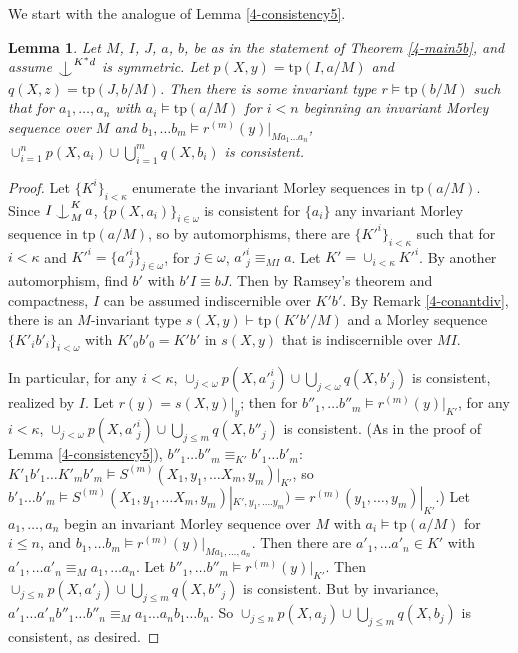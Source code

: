 \documentclass[12pt]{amsart}
\newtheorem{lemma}[theorem]{Lemma}
\theoremstyle{definition}
\def\Ind#1#2{#1\setbox0=\hbox{$#1x$}\kern\wd0\hbox to 0pt{\hss$#1\mid$\hss}
\lower.9\ht0\hbox to 0pt{\hss$#1\smile$\hss}\kern\wd0}
\def\ind{\mathop{\mathpalette\Ind{}}}
\begin{document}
We start with the analogue of Lemma \ref{4-consistency5}.

\begin{lemma}\label{4-consistency5b}
 Let $M$, $I$, $J$, $a$, $b$, be as in the statement of Theorem \ref{4-main5b}, and assume $\ind^{K^{*}d}$ is symmetric. Let  $p(X, y) = \mathrm{tp}(I, a/M)$ and $q(X, z) = \mathrm{tp}(J, b/M)$. Then there is some invariant type $r \models \mathrm{tp}(b/M)$ such that for $a_{1}, \ldots, a_{n}$ with $a_{i} \models \mathrm{tp}(a/M)$ for $i < n$ beginning an invariant Morley sequence over $M$ and $b_{1}, \ldots b_{m} \models r^{(m)}(y)|_{Ma_{1}\ldots a_{n}}$, $\cup_{i=1}^{n}p(X, a_{i}) \cup \bigcup_{i =1}^{m} q(X, b_{i})$ is consistent.
\end{lemma}

\begin{proof}
    Let $\{K^{i}\}_{i < \kappa}$ enumerate the invariant Morley sequences in $\mathrm{tp}(a/M)$. Since $I \ind_{M}^{K} a$, $\{p(X, a_{i})\}_{i \in \omega}$ is consistent for $\{a_{i}\}$ any invariant Morley sequence in $\mathrm{tp}(a/M)$, so by automorphisms, there are $\{K'^{i}\}_{i < \kappa}$ such that for $i< \kappa$ and $K'^{i}=\{a'^{i}_{j}\}_{j \in \omega}$, for $j \in \omega$, $a'^{i}_{j} \equiv_{MI} a$. Let $K'= \cup_{i < \kappa} K'^{i}$. By another automorphism, find $b'$ with $b'I \equiv bJ$. Then by Ramsey's theorem and compactness, $I$ can be assumed indiscernible over $K'b'$. By Remark \ref{4-conantdiv}, there is an $M$-invariant type $s(X, y) \vdash \mathrm{tp}(K'b'/M)$ and a Morley sequence $\{K'_{i}b'_{i}\}_{i < \omega }$ with $K'_{0}b'_{0}=K'b'$ in $s(X,y)$ that is indiscernible over $MI$.
    
    
    In particular, for any $i < \kappa$, $\cup_{j < \omega} p(X, a'^{i}_{j}) \cup \bigcup_{j < \omega} q(X, b'_{j})$ is consistent, realized by $I$. Let $r(y) = s(X, y)|_{y}$; then for $b''_{1}, \ldots b''_{m} \models r^{(m)}(y)|_{K'}$, for any $i < \kappa$, $\cup_{j < \omega} p(X, a'^{i}_{j}) \cup \bigcup_{j \leq m} q(X, b''_{j})$ is consistent. (As in the proof of Lemma \ref{4-consistency5}), $b''_{1} \ldots b''_{m} \equiv_{K'} b'_{1} \ldots b'_{m}$: $ K'_{1}b'_{1} \ldots K'_{m}b'_{m} \models S^{(m)}(X_{1}, y_{1}, \ldots X_{m}, y_{m})|_{K'}$, so $b'_{1} \ldots b'_{m} \models S^{(m)}(X_{1}, y_{1}, \ldots X_{m}, y_{m})|_{K', y_{1}, \ldots. y_{m}})=r^{(m)}(y_{1}, \ldots, y_{m})|_{K'}$.) Let $a_{1}, \ldots, a_{n}$ begin an invariant Morley sequence over $M$ with $a_{i} \models \mathrm{tp}(a/M)$ for $i \leq n$, and $b_{1}, \ldots b_{m} \models r^{(m)}(y)|_{Ma_{1}, \ldots, a_{n}}$. Then there are $a'_{1}, \ldots a'_{n} \in K'$ with $a'_{1}, \ldots a'_{n} \equiv_{M} a_{1}, \ldots a_{n}$. Let $b''_{1}, \ldots b''_{m} \models r^{(m)}(y)|_{K'}$. Then $\cup_{j \leq n} p(X, a'_{j}) \cup \bigcup_{j \leq m} q(X, b''_{j})$ is consistent. But by invariance, $a'_{1} \ldots a'_{n} b''_{1} \ldots b''_{n} \equiv_{M} a_{1} \ldots a_{n} b_{1} \ldots b_{n}$. So $\cup_{j \leq n} p(X, a_{j}) \cup \bigcup_{j \leq m} q(X, b_{j})$  is consistent, as desired. 
\end{proof}
\end{document}
